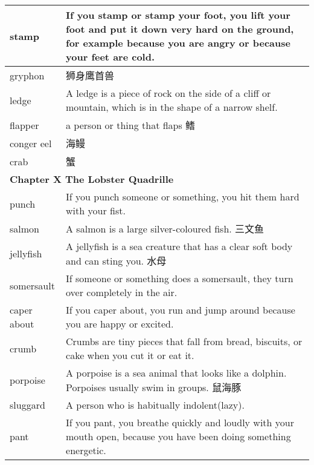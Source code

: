 \documentclass{ctexart}
\begin{document}
\begin{center}
\begin{longtable}{|l|p{7.8cm}|}
\hline
stamp
&
If you stamp or stamp your foot, you lift your foot and put it down very hard on the ground, for example because you are angry or because your feet are cold.
\\

\hline
gryphon
&
狮身鹰首兽
\\

\hline
ledge
&
A ledge is a piece of rock on the side of a cliff or mountain, which is in the shape of a narrow shelf.
\\

\hline
flapper
&
a person or thing that flaps 鳍
\\

\hline
conger eel
&
海鳗
\\

\hline
crab
&
蟹
\\

\hline
\multicolumn{2}{|l|}{\textbf{Chapter X The Lobster Quadrille}}\\

\hline
punch
&
If you punch someone or something, you hit them hard with your fist.
\\

\hline
salmon
&
A salmon is a large silver-coloured fish. 三文鱼
\\

\hline
jellyfish
&
A jellyfish is a sea creature that has a clear soft body and can sting you. 水母
\\

\hline
somersault
&
If someone or something does a somersault, they turn over completely in the air.
\\

\hline
caper about
&
If you caper about, you run and jump around because you are happy or excited.
\\

\hline
crumb
&
Crumbs are tiny pieces that fall from bread, biscuits, or cake when you cut it or eat it.
\\

\hline
porpoise
&
A porpoise is a sea animal that looks like a dolphin. Porpoises usually swim in groups. 鼠海豚
\\

\hline
sluggard
&
A person who is habitually indolent(lazy).
\\

\hline
pant
&
If you pant, you breathe quickly and loudly with your mouth open, because you have been doing something energetic.
\\

\hline

\end{longtable}
\end{center}
\end{document}
